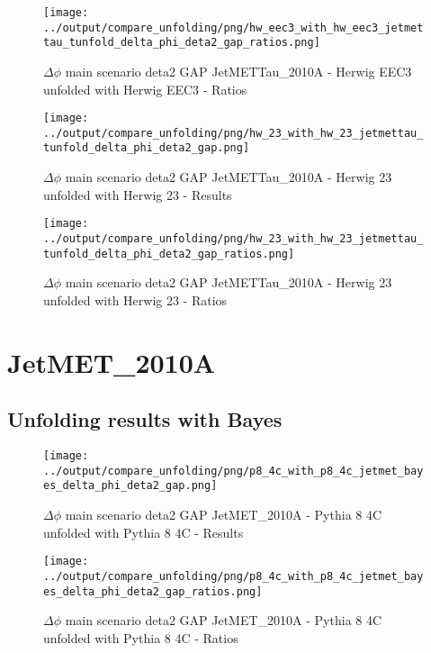 \documentclass[11pt]{book}
\begin{document}
\begin{figure}[ht]
\centering
\texttt{[image: ../output/compare\_unfolding/png/hw\_eec3\_with\_hw\_eec3\_jetmettau\_tunfold\_delta\_phi\_deta2\_gap\_ratios.png]}
\caption{$\Delta\phi$ main scenario deta2 GAP JetMETTau\_2010A - Herwig EEC3 unfolded with Herwig EEC3 - Ratios}
\label{hw_eec3_hw_eec3_jetmettau_tunfold_delta_phi_deta2_gap_b}
\end{figure}

\begin{figure}[ht]
\centering
\texttt{[image: ../output/compare\_unfolding/png/hw\_23\_with\_hw\_23\_jetmettau\_tunfold\_delta\_phi\_deta2\_gap.png]}
\caption{$\Delta\phi$ main scenario deta2 GAP JetMETTau\_2010A - Herwig 23 unfolded with Herwig 23 - Results}
\label{hw_23_hw_23_jetmettau_tunfold_delta_phi_deta2_gap_a}
\end{figure}

\begin{figure}[ht]
\centering
\texttt{[image: ../output/compare\_unfolding/png/hw\_23\_with\_hw\_23\_jetmettau\_tunfold\_delta\_phi\_deta2\_gap\_ratios.png]}
\caption{$\Delta\phi$ main scenario deta2 GAP JetMETTau\_2010A - Herwig 23 unfolded with Herwig 23 - Ratios}
\label{hw_23_hw_23_jetmettau_tunfold_delta_phi_deta2_gap_b}
\end{figure}


\section{JetMET\_2010A}
\subsection{Unfolding results with Bayes}

\begin{figure}[ht]
\centering
\texttt{[image: ../output/compare\_unfolding/png/p8\_4c\_with\_p8\_4c\_jetmet\_bayes\_delta\_phi\_deta2\_gap.png]}
\caption{$\Delta\phi$ main scenario deta2 GAP JetMET\_2010A - Pythia 8 4C unfolded with Pythia 8 4C - Results}
\label{p8_p8_jetmet_bayes_delta_phi_deta2_gap_a}
\end{figure}

\begin{figure}[ht]
\centering
\texttt{[image: ../output/compare\_unfolding/png/p8\_4c\_with\_p8\_4c\_jetmet\_bayes\_delta\_phi\_deta2\_gap\_ratios.png]}
\caption{$\Delta\phi$ main scenario deta2 GAP JetMET\_2010A - Pythia 8 4C unfolded with Pythia 8 4C - Ratios}
\label{p8_p8_jetmet_bayes_delta_phi_deta2_gap_b}
\end{figure}
\end{document}

